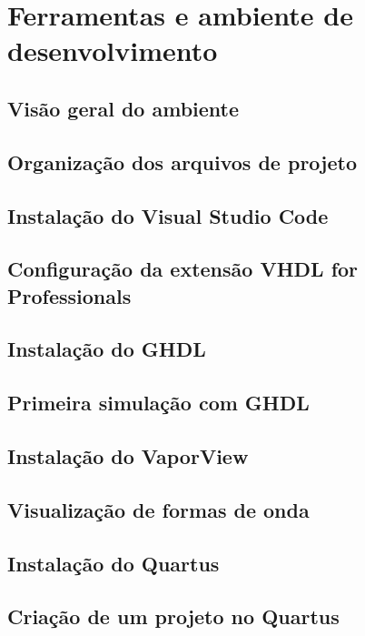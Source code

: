 \chapter{Ferramentas e ambiente de desenvolvimento}

\section{Visão geral do ambiente}

\section{Organização dos arquivos de projeto}

\section{Instalação do Visual Studio Code}

\section{Configuração da extensão VHDL for Professionals}

\section{Instalação do GHDL}

\section{Primeira simulação com GHDL}

\section{Instalação do VaporView}

\section{Visualização de formas de onda}

\section{Instalação do Quartus}

\section{Criação de um projeto no Quartus}

